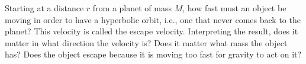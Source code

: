 \answercheck Starting at a distance $r$ from a planet of mass $M$, how
fast must an object be moving in order to have a hyperbolic
orbit, i.e., one that never comes back to the planet? This
velocity is called the escape velocity. Interpreting the
result, does it matter in what direction the velocity is?
Does it matter what mass the object has? Does the object
escape because it is moving too fast for gravity to act on it?
